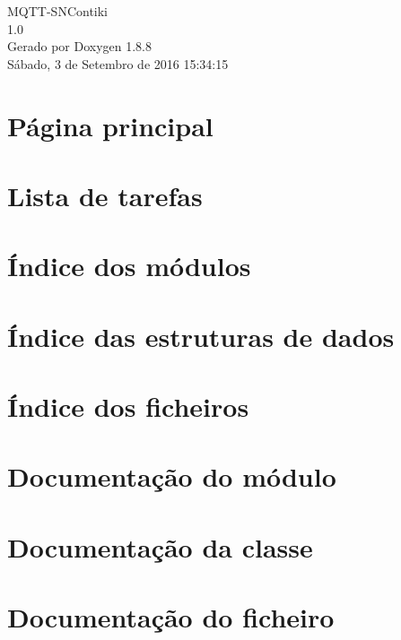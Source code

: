 \documentclass[twoside]{book}
\newcommand{\+}{\discretionary{\mbox{\scriptsize$\hookleftarrow$}}{}{}}
\newcommand{\clearemptydoublepage}{%
  \newpage{\pagestyle{empty}\cleardoublepage}%
}
\begin{document}
\hypersetup{pageanchor=false,
             bookmarks=true,
             bookmarksnumbered=true,
             pdfencoding=unicode
            }
\begin{titlepage}
\vspace*{7cm}
\begin{center}%
{\Large M\+Q\+T\+T-\/\+S\+N\+Contiki \\[1ex]\large 1.\+0 }\\
\vspace*{1cm}
{\large Gerado por Doxygen 1.8.8}\\
\vspace*{0.5cm}
{\small Sábado, 3 de Setembro de 2016 15:34:15}\\
\end{center}
\end{titlepage}
\clearemptydoublepage
\tableofcontents
\clearemptydoublepage
{}
\hypersetup{pageanchor=true}

\chapter{Página principal}
\label{index}\hypertarget{index}{}
\chapter{Lista de tarefas}
\label{todo}
\hypertarget{todo}{}

\chapter{Índice dos módulos}

\chapter{Índice das estruturas de dados}

\chapter{Índice dos ficheiros}

\chapter{Documentação do módulo}





\chapter{Documentação da classe}














\chapter{Documentação do ficheiro}





\newpage
{}
{}
\printindex
\end{document}
